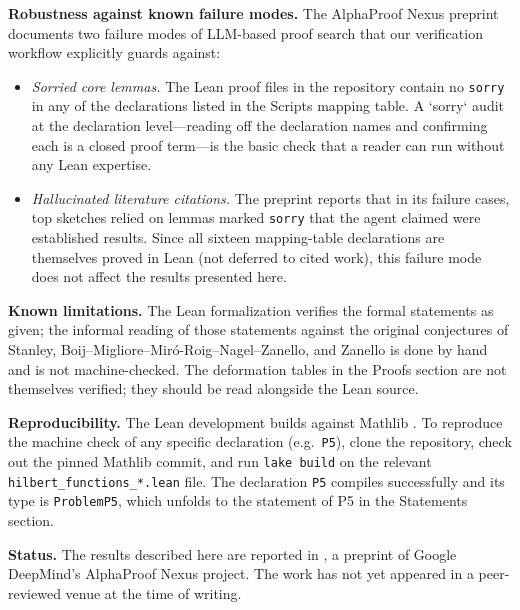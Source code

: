 \documentclass[11pt,reqno]{amsart}
\begin{document}
\medskip\noindent\textbf{Robustness against known failure modes.} The
AlphaProof Nexus preprint \cite{tsoukalas2026} documents two failure modes
of LLM-based proof search that our verification workflow explicitly guards
against:

\begin{itemize}
\item \emph{Sorried core lemmas.} The Lean proof files in the repository
contain no \texttt{sorry} in any of the declarations listed in the Scripts
mapping table. A `sorry` audit at the declaration level---reading off the
declaration names and confirming each is a closed proof term---is the basic
check that a reader can run without any Lean expertise.

\item \emph{Hallucinated literature citations.} The preprint reports that in
its failure cases, top sketches relied on lemmas marked \texttt{sorry} that
the agent claimed were established results. Since all sixteen mapping-table
declarations are themselves proved in Lean (not deferred to cited work),
this failure mode does not affect the results presented here.
\end{itemize}

\medskip\noindent\textbf{Known limitations.} The Lean formalization verifies
the formal statements as given; the informal reading of those statements
against the original conjectures of Stanley,
Boij--Migliore--Mir\'o-Roig--Nagel--Zanello, and Zanello is done by hand and
is not machine-checked. The deformation tables in the Proofs section are not
themselves verified; they should be read alongside the Lean source.

\medskip\noindent\textbf{Reproducibility.} The Lean development builds
against Mathlib \cite{mathlib2020}. To reproduce the machine check of any
specific declaration (e.g.\ \texttt{P5}), clone the repository, check out
the pinned Mathlib commit, and run \texttt{lake build} on the relevant 
\texttt{hilbert\_functions\_*.lean} file. The declaration \texttt{P5}
compiles successfully and its type is \texttt{ProblemP5}, which unfolds to
the statement of P5 in the Statements section.

\medskip\noindent\textbf{Status.} The results described here are reported in 
\cite{tsoukalas2026}, a preprint of Google DeepMind's AlphaProof Nexus
project. The work has not yet appeared in a peer-reviewed venue at the time
of writing.

\end{document}
